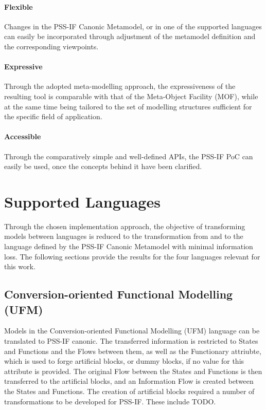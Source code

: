 \paragraph{Flexible} Changes in the PSS-IF Canonic Metamodel, or in one of the supported languages can easily be incorporated through adjustment of the metamodel definition and the corresponding viewpoints.

\paragraph{Expressive} Through the adopted meta-modelling approach, the expressiveness of the resulting tool is comparable with that of the Meta-Object Facility (MOF), while at the same time being tailored to the set of modelling structures sufficient for the specific field of application.

\paragraph{Accessible} Through the comparatively simple and well-defined APIs, the PSS-IF PoC can easily be used, once the concepts behind it have been clarified.

\section{Supported Languages}
\label{sec:results:languages}

Through the chosen implementation approach, the objective of transforming models between languages is reduced to the transformation from and to the language defined by the PSS-IF Canonic Metamodel with minimal information loss. The following sections provide the results for the four languages relevant for this work.

\subsection{Conversion-oriented Functional Modelling (UFM)}

Models in the Conversion-oriented Functional Modelling (UFM) language can be translated to PSS-IF canonic. The transferred information is restricted to States and Functions and the Flows between them, as well as the Functionary attriubte, which is used to forge artificial blocks, or dummy blocks, if no value for this attribute is provided. The original Flow between the States and Functions is then transferred to the artificial blocks, and an Information Flow is created between the States and Functions. The creation of artificial blocks required a number of transformations to be developed for PSS-IF. These include \color{red}TODO\color{black}.

